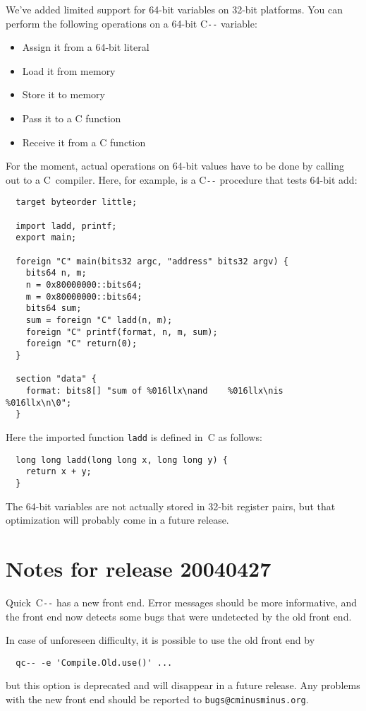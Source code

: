 \documentclass{article}
\def\PAL{\mbox{C{\texttt{-{}-}}}}
\begin{document}
We've added limited support for 64-bit variables on 32-bit platforms.
You can perform the following operations on a 64-bit {\PAL} variable:
\begin{itemize}
\item Assign it from a 64-bit literal
\item   Load it from memory
\item    Store it to memory
\item   Pass it to a C function
\item   Receive it from a C function
\end{itemize}
For the moment, actual operations on 64-bit values have to be done by
calling out to a C~compiler.
Here, for example, is a {\PAL}
procedure that tests 64-bit add:
\begin{verbatim} 
  target byteorder little;
  
  import ladd, printf;
  export main;
  
  foreign "C" main(bits32 argc, "address" bits32 argv) {
    bits64 n, m;
    n = 0x80000000::bits64;
    m = 0x80000000::bits64;
    bits64 sum;
    sum = foreign "C" ladd(n, m);
    foreign "C" printf(format, n, m, sum);
    foreign "C" return(0);
  }

  section "data" {
    format: bits8[] "sum of %016llx\nand    %016llx\nis     %016llx\n\0";
  }
\end{verbatim}
Here the imported function \texttt{ladd} is defined in~C as follows:
\begin{verbatim} 
  long long ladd(long long x, long long y) {
    return x + y;
  }
\end{verbatim}
The 64-bit variables are not actually stored in 32-bit register pairs,
but that optimization will probably come in a future release.


\section{Notes for release 20040427}

Quick~{\PAL} has a new front end.
Error messages should be more informative, and the front end now
detects some bugs that were undetected by the old front end.

In case of unforeseen difficulty, it is possible to use the old front
end by
\begin{verbatim}
  qc-- -e 'Compile.Old.use()' ...
\end{verbatim}
but this option is deprecated and will disappear in a future release.
Any problems with the new front end should be reported to
\texttt{bugs@cminusminus.org}. 
\end{document}
